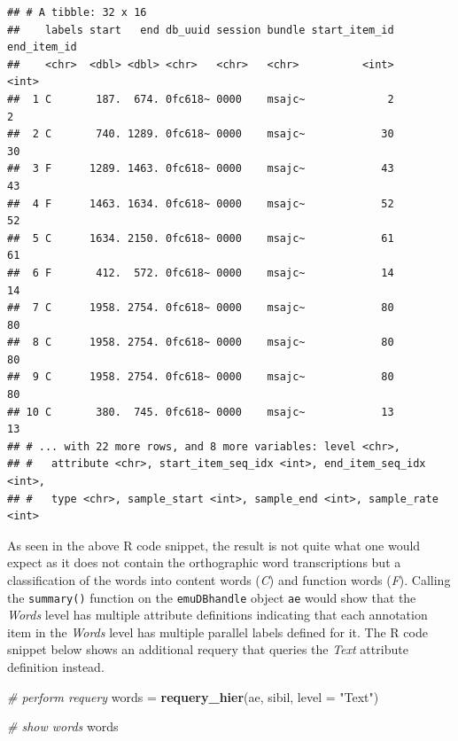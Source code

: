 \documentclass[]{book}
\newenvironment{Shaded}{\begin{snugshade}}{\end{snugshade}}
\newcommand{\CommentTok}[1]{\textcolor[rgb]{0.56,0.35,0.01}{\textit{#1}}}
\newcommand{\DataTypeTok}[1]{\textcolor[rgb]{0.13,0.29,0.53}{#1}}
\newcommand{\KeywordTok}[1]{\textcolor[rgb]{0.13,0.29,0.53}{\textbf{#1}}}
\newcommand{\NormalTok}[1]{#1}
\newcommand{\StringTok}[1]{\textcolor[rgb]{0.31,0.60,0.02}{#1}}
\begin{document}
\begin{verbatim}
## # A tibble: 32 x 16
##    labels start   end db_uuid session bundle start_item_id end_item_id
##    <chr>  <dbl> <dbl> <chr>   <chr>   <chr>          <int>       <int>
##  1 C       187.  674. 0fc618~ 0000    msajc~             2           2
##  2 C       740. 1289. 0fc618~ 0000    msajc~            30          30
##  3 F      1289. 1463. 0fc618~ 0000    msajc~            43          43
##  4 F      1463. 1634. 0fc618~ 0000    msajc~            52          52
##  5 C      1634. 2150. 0fc618~ 0000    msajc~            61          61
##  6 F       412.  572. 0fc618~ 0000    msajc~            14          14
##  7 C      1958. 2754. 0fc618~ 0000    msajc~            80          80
##  8 C      1958. 2754. 0fc618~ 0000    msajc~            80          80
##  9 C      1958. 2754. 0fc618~ 0000    msajc~            80          80
## 10 C       380.  745. 0fc618~ 0000    msajc~            13          13
## # ... with 22 more rows, and 8 more variables: level <chr>,
## #   attribute <chr>, start_item_seq_idx <int>, end_item_seq_idx <int>,
## #   type <chr>, sample_start <int>, sample_end <int>, sample_rate <int>
\end{verbatim}

As seen in the above R code snippet, the result is not quite what one would expect as it does not contain the orthographic word transcriptions but a classification of the words into content words (\emph{C}) and function words (\emph{F}). Calling the \texttt{summary()} function on the \texttt{emuDBhandle} object \texttt{ae} would show that the \emph{Words} level has multiple attribute definitions indicating that each annotation item in the \emph{Words} level has multiple parallel labels defined for it. The R code snippet below shows an additional requery that queries the \emph{Text} attribute definition instead.

\begin{Shaded}
\begin{Highlighting}[]
\CommentTok{# perform requery}
\NormalTok{words =}\StringTok{ }\KeywordTok{requery_hier}\NormalTok{(ae, sibil, }\DataTypeTok{level =} \StringTok{"Text"}\NormalTok{)}

\CommentTok{# show words}
\NormalTok{words}
\end{Highlighting}
\end{Shaded}
\end{document}
